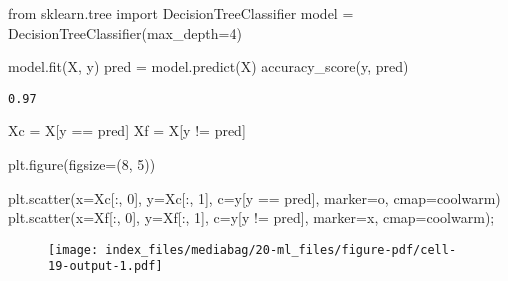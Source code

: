 \documentclass[
  letterpaper,
  DIV=11,
  numbers=noendperiod]{scrreprt}
\newenvironment{Shaded}{\begin{snugshade}}{\end{snugshade}}
\newcommand{\DecValTok}[1]{\textcolor[rgb]{0.68,0.00,0.00}{#1}}
\newcommand{\ImportTok}[1]{\textcolor[rgb]{0.00,0.46,0.62}{#1}}
\newcommand{\NormalTok}[1]{\textcolor[rgb]{0.00,0.23,0.31}{#1}}
\newcommand{\OperatorTok}[1]{\textcolor[rgb]{0.37,0.37,0.37}{#1}}
\newcommand{\StringTok}[1]{\textcolor[rgb]{0.13,0.47,0.30}{#1}}
\begin{document}
\begin{Shaded}
\begin{Highlighting}[]
\ImportTok{from}\NormalTok{ sklearn.tree }\ImportTok{import}\NormalTok{ DecisionTreeClassifier}
\NormalTok{model }\OperatorTok{=}\NormalTok{ DecisionTreeClassifier(max\_depth}\OperatorTok{=}\DecValTok{4}\NormalTok{)}
\end{Highlighting}
\end{Shaded}

\begin{Shaded}
\begin{Highlighting}[]
\NormalTok{model.fit(X, y) }
\NormalTok{pred }\OperatorTok{=}\NormalTok{ model.predict(X) }
\NormalTok{accuracy\_score(y, pred) }
\end{Highlighting}
\end{Shaded}

\begin{verbatim}
0.97
\end{verbatim}

\begin{Shaded}
\begin{Highlighting}[]
\NormalTok{Xc }\OperatorTok{=}\NormalTok{ X[y }\OperatorTok{==}\NormalTok{ pred]}
\NormalTok{Xf }\OperatorTok{=}\NormalTok{ X[y }\OperatorTok{!=}\NormalTok{ pred]}

\NormalTok{plt.figure(figsize}\OperatorTok{=}\NormalTok{(}\DecValTok{8}\NormalTok{, }\DecValTok{5}\NormalTok{))}

\NormalTok{plt.scatter(x}\OperatorTok{=}\NormalTok{Xc[:, }\DecValTok{0}\NormalTok{], y}\OperatorTok{=}\NormalTok{Xc[:, }\DecValTok{1}\NormalTok{], c}\OperatorTok{=}\NormalTok{y[y }\OperatorTok{==}\NormalTok{ pred],}
\NormalTok{            marker}\OperatorTok{=}\StringTok{\textquotesingle{}o\textquotesingle{}}\NormalTok{, cmap}\OperatorTok{=}\StringTok{\textquotesingle{}coolwarm\textquotesingle{}}\NormalTok{)}
\NormalTok{plt.scatter(x}\OperatorTok{=}\NormalTok{Xf[:, }\DecValTok{0}\NormalTok{], y}\OperatorTok{=}\NormalTok{Xf[:, }\DecValTok{1}\NormalTok{], c}\OperatorTok{=}\NormalTok{y[y }\OperatorTok{!=}\NormalTok{ pred],}
\NormalTok{            marker}\OperatorTok{=}\StringTok{\textquotesingle{}x\textquotesingle{}}\NormalTok{, cmap}\OperatorTok{=}\StringTok{\textquotesingle{}coolwarm\textquotesingle{}}\NormalTok{)}\OperatorTok{;}
\end{Highlighting}
\end{Shaded}

\begin{figure}[H]

{\centering \texttt{[image: index\_files/mediabag/20-ml\_files/figure-pdf/cell-19-output-1.pdf]}

}

\end{figure}
\end{document}
